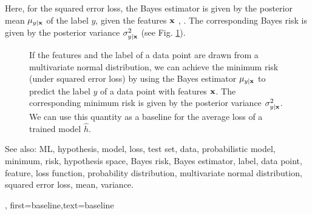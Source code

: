 {{Here, for the squared error loss, the Bayes estimator is given by the posterior 
mean $\mu_{y|{\bf x}}$ of the label $y$, given the 
features ${\bf x}$ \cite{LC}, \cite{GrayProbBook}. The corresponding Bayes risk 
is given by the posterior variance 
$\sigma^{2}_{y|{\bf x}}$ (see Fig. \ref{fig_post_baseline_dict}).
	\begin{figure}[H]
		\begin{center}
		\end{center}
		\caption{If the features and the label of a data point are drawn from a multivariate normal distribution, we 
		can achieve the minimum risk (under squared error loss) by using the Bayes estimator $\mu_{y|{\bf x}}$ 
		to predict the label $y$ of a data point with features ${\bf x}$. The corresponding 
		minimum risk is given by the posterior variance $\sigma^{2}_{y|{\bf x}}$. We can use 
		this quantity as a baseline for the average loss of a trained model $\hat{h}$. \label{fig_post_baseline_dict}}
	\end{figure}
		See also: ML, hypothesis, model, loss, test set, data, probabilistic model, minimum, risk, hypothesis space, Bayes risk, Bayes estimator, label, data point, feature, loss function, probability distribution, multivariate normal distribution, squared error loss, mean, variance.},
    first={baseline},text={baseline}
}

